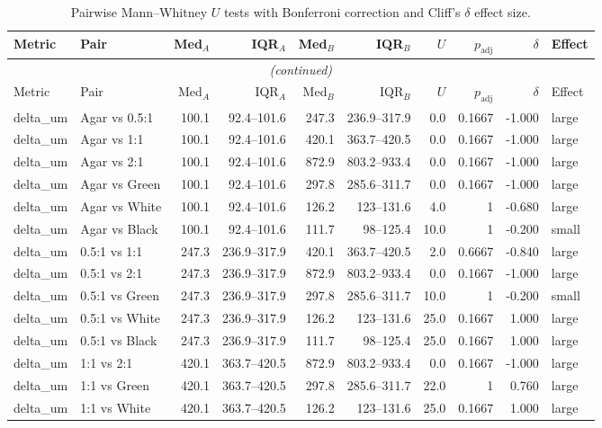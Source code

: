 \begin{longtable}{ll rr rr rrr l}
\caption{Pairwise Mann--Whitney $U$ tests with Bonferroni correction and Cliff's $\delta$ effect size.}
\label{tab:pairwise}\\
\toprule
Metric & Pair & Med$_A$ & IQR$_A$ & Med$_B$ & IQR$_B$ & $U$ & $p_{\text{adj}}$ & $\delta$ & Effect \\
\midrule
\endfirsthead
\multicolumn{10}{c}{\textit{(continued)}} \\
\toprule
Metric & Pair & Med$_A$ & IQR$_A$ & Med$_B$ & IQR$_B$ & $U$ & $p_{\text{adj}}$ & $\delta$ & Effect \\
\midrule
\endhead
delta_um & Agar vs 0.5:1 & 100.1 & 92.4–101.6 & 247.3 & 236.9–317.9 & 0.0 & 0.1667 & -1.000 & large \\
delta_um & Agar vs 1:1 & 100.1 & 92.4–101.6 & 420.1 & 363.7–420.5 & 0.0 & 0.1667 & -1.000 & large \\
delta_um & Agar vs 2:1 & 100.1 & 92.4–101.6 & 872.9 & 803.2–933.4 & 0.0 & 0.1667 & -1.000 & large \\
delta_um & Agar vs Green & 100.1 & 92.4–101.6 & 297.8 & 285.6–311.7 & 0.0 & 0.1667 & -1.000 & large \\
delta_um & Agar vs White & 100.1 & 92.4–101.6 & 126.2 & 123–131.6 & 4.0 & 1 & -0.680 & large \\
delta_um & Agar vs Black & 100.1 & 92.4–101.6 & 111.7 & 98–125.4 & 10.0 & 1 & -0.200 & small \\
delta_um & 0.5:1 vs 1:1 & 247.3 & 236.9–317.9 & 420.1 & 363.7–420.5 & 2.0 & 0.6667 & -0.840 & large \\
delta_um & 0.5:1 vs 2:1 & 247.3 & 236.9–317.9 & 872.9 & 803.2–933.4 & 0.0 & 0.1667 & -1.000 & large \\
delta_um & 0.5:1 vs Green & 247.3 & 236.9–317.9 & 297.8 & 285.6–311.7 & 10.0 & 1 & -0.200 & small \\
delta_um & 0.5:1 vs White & 247.3 & 236.9–317.9 & 126.2 & 123–131.6 & 25.0 & 0.1667 & 1.000 & large \\
delta_um & 0.5:1 vs Black & 247.3 & 236.9–317.9 & 111.7 & 98–125.4 & 25.0 & 0.1667 & 1.000 & large \\
delta_um & 1:1 vs 2:1 & 420.1 & 363.7–420.5 & 872.9 & 803.2–933.4 & 0.0 & 0.1667 & -1.000 & large \\
delta_um & 1:1 vs Green & 420.1 & 363.7–420.5 & 297.8 & 285.6–311.7 & 22.0 & 1 & 0.760 & large \\
delta_um & 1:1 vs White & 420.1 & 363.7–420.5 & 126.2 & 123–131.6 & 25.0 & 0.1667 & 1.000 & large \\

\end{longtable}
